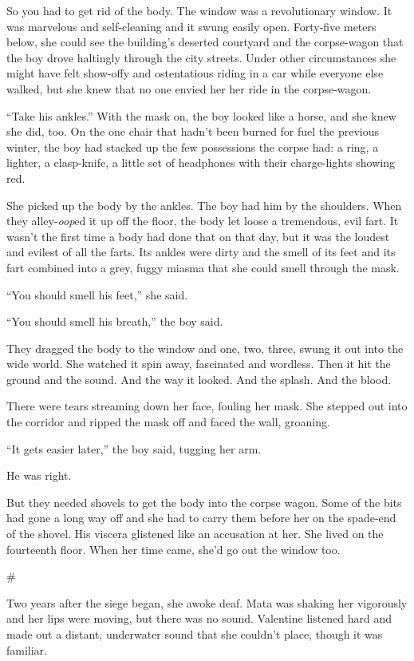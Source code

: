 So you had to get rid of the body. The window was a revolutionary
window. It was marvelous and self-cleaning and it swung easily
open. Forty-five meters below, she could see the building’s
deserted courtyard and the corpse-wagon that the boy drove
haltingly through the city streets. Under other circumstances she
might have felt show-offy and ostentatious riding in a car while
everyone else walked, but she knew that no one envied her her ride
in the corpse-wagon.

“Take his ankles.” With the mask on, the boy looked like a horse,
and she knew she did, too. On the one chair that hadn’t been burned
for fuel the previous winter, the boy had stacked up the few
possessions the corpse had: a ring, a lighter, a clasp-knife, a
little set of headphones with their charge-lights showing red.

She picked up the body by the ankles. The boy had him by the
shoulders. When they alley-\emph{oop}ed it up off the floor, the
body let loose a tremendous, evil fart. It wasn’t the first time a
body had done that on that day, but it was the loudest and evilest
of all the farts. Its ankles were dirty and the smell of its feet
and its fart combined into a grey, fuggy miasma that she could
smell through the mask.

“You should smell his feet,” she said.

“You should smell his breath,” the boy said.

They dragged the body to the window and one, two, three, swung it
out into the wide world. She watched it spin away, fascinated and
wordless. Then it hit the ground and the sound. And the way it
looked. And the splash. And the blood.

There were tears streaming down her face, fouling her mask. She
stepped out into the corridor and ripped the mask off and faced the
wall, groaning.

“It gets easier later,” the boy said, tugging her arm.

He was right.

But they needed shovels to get the body into the corpse wagon. Some
of the bits had gone a long way off and she had to carry them
before her on the spade-end of the shovel. His viscera glistened
like an accusation at her. She lived on the fourteenth floor. When
her time came, she’d go out the window too.

\#

Two years after the siege began, she awoke deaf. Mata was shaking
her vigorously and her lips were moving, but there was no sound.
Valentine listened hard and made out a distant, underwater sound
that she couldn’t place, though it was familiar.

